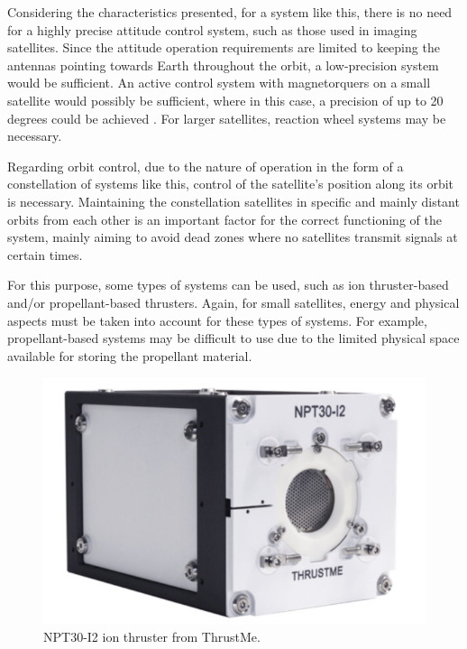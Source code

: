
Considering the characteristics presented, for a system like this, there is no need for a highly precise attitude control system, such as those used in imaging satellites. Since the attitude operation requirements are limited to keeping the antennas pointing towards Earth throughout the orbit, a low-precision system would be sufficient. An active control system with magnetorquers on a small satellite would possibly be sufficient, where in this case, a precision of up to 20 degrees could be achieved \cite{carrara2017}. For larger satellites, reaction wheel systems may be necessary.

Regarding orbit control, due to the nature of operation in the form of a constellation of systems like this, control of the satellite's position along its orbit is necessary. Maintaining the constellation satellites in specific and mainly distant orbits from each other is an important factor for the correct functioning of the system, mainly aiming to avoid dead zones where no satellites transmit signals at certain times.

For this purpose, some types of systems can be used, such as ion thruster-based and/or propellant-based thrusters. Again, for small satellites, energy and physical aspects must be taken into account for these types of systems. For example, propellant-based systems may be difficult to use due to the limited physical space available for storing the propellant material.

\begin{figure}[!ht]
    \begin{center}
        \includegraphics[width=0.5\columnwidth]{figures/npt30-i2}
        \caption{NPT30-I2 ion thruster from ThrustMe.}
        \label{fig:thrustme-npt30-i2}
    \end{center}
\end{figure}

